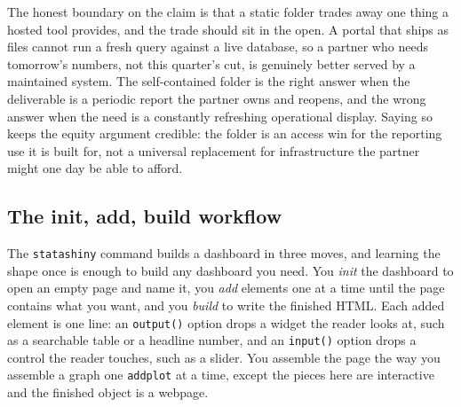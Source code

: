 \documentclass[
    a4paper,
    fontsize=10pt,
    twoside=true,
    numbers=noenddot,
]{kaobook}
\begin{document}
The honest boundary on the claim is that a static folder trades away one thing a hosted tool provides, and the trade should sit in the open. A portal that ships as files cannot run a fresh query against a live database, so a partner who needs tomorrow's numbers, not this quarter's cut, is genuinely better served by a maintained system. The self-contained folder is the right answer when the deliverable is a periodic report the partner owns and reopens, and the wrong answer when the need is a constantly refreshing operational display. Saying so keeps the equity argument credible: the folder is an access win for the reporting use it is built for, not a universal replacement for infrastructure the partner might one day be able to afford.

\subsection{The init, add, build workflow}
The \texttt{statashiny} command builds a dashboard in three moves, and learning the shape once is enough to build any dashboard you need. You \emph{init} the dashboard to open an empty page and name it, you \emph{add} elements one at a time until the page contains what you want, and you \emph{build} to write the finished HTML. Each added element is one line: an \texttt{output()} option drops a widget the reader looks at, such as a searchable table or a headline number, and an \texttt{input()} option drops a control the reader touches, such as a slider. You assemble the page the way you assemble a graph one \texttt{addplot} at a time, except the pieces here are interactive and the finished object is a webpage.
\end{document}
